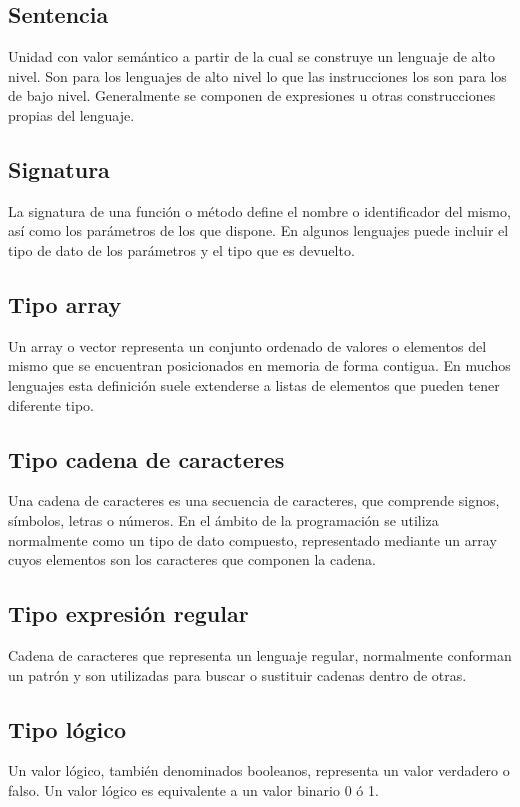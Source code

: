 \subsection{Sentencia}
Unidad con valor semántico a partir de la cual se construye un lenguaje de alto nivel. Son para los lenguajes de alto nivel lo que las instrucciones
los son para los de bajo nivel. Generalmente se componen de expresiones u otras construcciones propias del lenguaje.\\

\subsection {Signatura}
La signatura de una función o método define el nombre o identificador del mismo, así como los parámetros de los que dispone. En algunos lenguajes puede incluir el tipo de dato de los parámetros 
y el tipo que es devuelto.  \\

\subsection {Tipo array}
Un array o vector representa un conjunto ordenado de valores o elementos del mismo que se encuentran posicionados en memoria de forma contigua. En muchos lenguajes
esta definición suele extenderse a listas de elementos que pueden tener diferente tipo.\\

\subsection {Tipo cadena de caracteres}
Una cadena de caracteres es una secuencia de caracteres, que comprende signos, símbolos, letras o números. En el ámbito de la programación se utiliza normalmente como un tipo de 
dato compuesto, representado mediante un array cuyos elementos son los caracteres que componen la cadena.\\

\subsection {Tipo expresión regular}
Cadena de caracteres que representa un lenguaje regular, normalmente conforman un patrón y son utilizadas para buscar o 
sustituir cadenas dentro de otras. \\

\subsection {Tipo lógico}
Un valor lógico, también denominados booleanos, representa un valor verdadero o falso. Un valor lógico es equivalente a un valor binario 0 ó 1.\\

